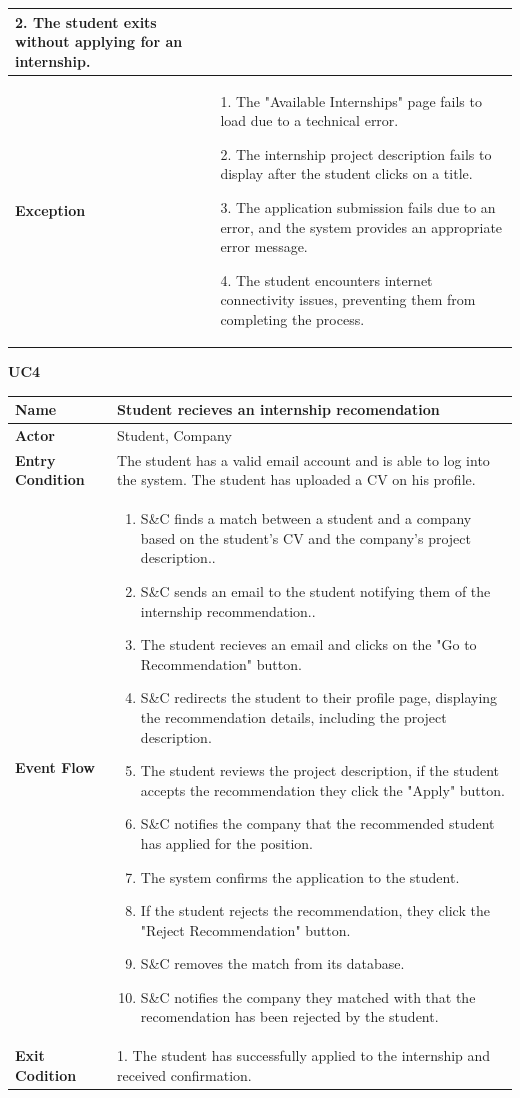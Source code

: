 \begin{longtable}{|p{}|p{}|}
2. The student exits without applying for an internship.\\
\hline
\textbf{Exception} &  
1. The "Available Internships" page fails to load due to a technical error.	

2. The internship project description fails to display after the student clicks on a title.

3. The application submission fails due to an error, and the system provides an appropriate error message.	

4. The student encounters internet connectivity issues, preventing them from completing the process.\\
\hline
\end{longtable}


\textbf{UC4}

\begin{longtable}{|p{}|p{}|}
\hline
\textbf{Name} &  Student recieves an internship recomendation\\
\hline
\textbf{Actor} &  Student, Company\\
\hline
\textbf{Entry Condition} &  The student has a valid email account and is able to log into the system. The student has uploaded a CV on his profile.\\
\hline
\textbf{Event Flow} &  
\begin{enumerate}
\item S\&C finds a match between a student and a company based on the student's CV and the company’s project description..
\item S\&C sends an email to the student notifying them of the internship recommendation..
\item The student recieves an email and clicks on the "Go to Recommendation" button.
\item S\&C redirects the student to their profile page, displaying the recommendation details, including the project description.
\item The student reviews the project description, if the student accepts the recommendation they click the "Apply" button.
\item S\&C notifies the company that the recommended student has applied for the position.
\item The system confirms the application to the student.
\item If the student rejects the recommendation, they click the "Reject Recommendation" button.
\item S\&C removes the match from its database.
\item S\&C notifies the company they matched with that the recomendation has been rejected by the student. 
\end{enumerate}
\\
\hline
\textbf{Exit Codition} & 
1. The student has successfully applied to the internship and received confirmation.


\end{longtable}
